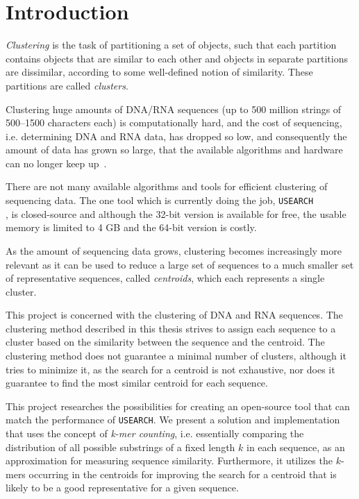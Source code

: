\section{Introduction}
\label{sec:introduction}

\emph{Clustering} is the task of partitioning a set of objects, such that each
partition contains objects that are similar to each other and objects in
separate partitions are dissimilar, according to some well-defined notion of
similarity. These partitions are called \emph{clusters}.

Clustering huge amounts of DNA/RNA sequences (up to \num{500} million strings of
\num{500}--\num{1500} characters each) is computationally hard, and the cost of sequencing,
i.e. determining DNA and RNA data, has dropped so low, and consequently the
amount of data has grown so large, that the available algorithms and hardware
can no longer keep up~\cite{rothberg}.

There are not many available algorithms and tools for efficient clustering of
sequencing data. The one tool which is currently doing the job,
\texttt{USEARCH} \\ 
\cite{edgar,usearch}, is closed-source and although the \num{32}-bit
version is available for free, the usable memory is limited to \num{4} GB and the
\num{64}-bit version is costly.

As the amount of sequencing data grows, clustering becomes increasingly more
relevant as it can be used to reduce a large set of sequences to a much smaller
set of representative sequences, called \emph{centroids}, which each represents
a single cluster.

This project is concerned with the clustering of DNA and RNA sequences. The
clustering method described in this thesis strives to assign each sequence to
a cluster based on the similarity between the sequence and the centroid. The
clustering method does not guarantee a minimal number of clusters, although it
tries to minimize it, as the search for a centroid is not exhaustive, nor does
it guarantee to find the most similar centroid for each sequence.

This project researches the possibilities for creating an open-source tool that
can match the performance of \texttt{USEARCH}. We present a solution and
implementation that uses the concept of \emph{k-mer counting}, i.e. essentially
comparing the distribution of all possible substrings of a fixed length $k$ in
each sequence, as an approximation for measuring sequence similarity.
Furthermore, it utilizes the $k$-mers occurring in the centroids for improving
the search for a centroid that is likely to be a good representative for a
given sequence.

